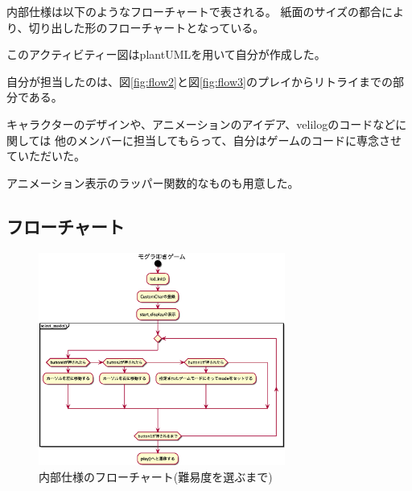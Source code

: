 \documentclass[11pt,a4j]{jsarticle}
\makeatletter
\newcommand{\figcaption}[1]{\def\@captype{figure}\caption{#1}}
\makeatother
\begin{document}
内部仕様は以下のようなフローチャートで表される。
紙面のサイズの都合により、切り出した形のフローチャートとなっている。

このアクティビティー図はplantUMLを用いて自分が作成した。

自分が担当したのは、図\ref{fig:flow2}と図\ref{fig:flow3}のプレイからリトライまでの部分である。

キャラクターのデザインや、アニメーションのアイデア、velilogのコードなどに関しては
他のメンバーに担当してもらって、自分はゲームのコードに専念させていただいた。

アニメーション表示のラッパー関数的なものも用意した。

\subsection{フローチャート}
\label{sub:フローチャート}


\begin{figure}[H]
  \centering
  \includegraphics[height=70mm]{img/mogura_init.eps}
  \figcaption{内部仕様のフローチャート(難易度を選ぶまで)}
  \label{fig:flow1}
\end{figure}
\end{document}
